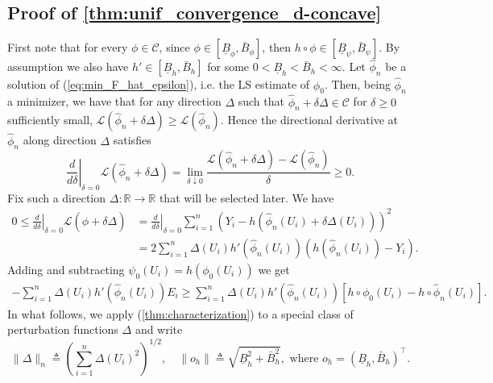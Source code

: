 \documentclass{article} %
\def\eqref#1{equation~\ref{#1}}
\renewcommand{\eqref}[1]{(\ref{#1})}
\begin{document}
\newpage
\subsection{Proof of \cref{thm:unif_convergence_d-concave}}\label{app:unif_convergence_d-concave}
First note that for every $\phi \in \mathcal{C}$, since $\phi \in [\underline{B}_{\phi},\bar{B}_{\phi}]$, then $h \circ \phi \in [\underline{B}_{\psi}, \bar{B}_{\psi}]$. By assumption we also have $h' \in [\underline{B}_{h},\bar{B}_{h}]$ for some $0<\underline{B}_{h}<\bar{B}_{h}<\infty$. Let $\widehat{\phi}_n$ be a solution of \eqref{eq:min_F_hat_epsilon}, i.e. the LS estimate of $\phi_0$. Then, being $\widehat{\phi}_n$ a minimizer, we have that for any direction $\Delta$ such that $\widehat{\phi}_n+\delta \Delta \in \mathcal{C}$ for $\delta\geq 0$ sufficiently small, $\mathcal{L}(\widehat{\phi}_n+\delta \Delta) \geq \mathcal{L}(\widehat{\phi}_n)$. Hence the directional derivative at $\widehat{\phi}_n$ along direction $\Delta$ satisfies 
$$
\left.\frac{d}{d \delta}\right|_{\delta=0} 
\mathcal{L} (\widehat \phi_n + \delta \Delta) = \lim _{\delta \downarrow 0} \frac{\mathcal{L} (\widehat \phi_n + \delta \Delta)-\mathcal{L} (\widehat \phi_n)}{\delta} \geq 0.
$$
Fix such a direction $\Delta: \mathbb{R} \rightarrow \mathbb{R}$ that will be selected later. We have
\begin{align*}
0 \leq\left.\frac{d}{d \delta}\right|_{\delta=0} 
\mathcal{L} (\widehat \phi + \delta \Delta) &= \left.\frac{d}{d \delta}\right|_{\delta=0} \sum_{i=1}^n\left(Y_i-h(\widehat{\phi}_n\left(U_i\right)+\delta\Delta\left(U_i\right))\right)^2\\
&=2 \sum_{i=1}^n \Delta\left(U_i\right)h'(\widehat{\phi}_n\left(U_i\right))  \left(h(\widehat{\phi}_n\left(U_i\right))-Y_i\right).
\end{align*}
\noindent
Adding and subtracting $\psi_0(U_i) = h(\phi_0 (U_i))$ we get
\begin{align}\label{thm:characterization}
-\sum_{i=1}^n \Delta\left(U_i\right)h'(\widehat{\phi}_n\left(U_i\right)) E_i \geq \sum_{i=1}^n \Delta\left(U_i\right)h'(\widehat{\phi}_n\left(U_i\right))  \left[h\circ \phi_0\left(U_i\right)-h \circ \widehat{\phi}_n\left(U_i\right)\right].
\end{align}
In what follows, we apply \eqref{thm:characterization} to a special class of perturbation functions $\Delta$ and write
$$
\|\Delta\|_n\triangleq \left(\sum_{i=1}^n \Delta\left(U_i\right)^2\right)^{1 / 2}, \quad \|o_h\| \triangleq \sqrt{\underline{B}_{h}^2+\bar{B}_{h}^2}, \text{ where } o_h = (\underline{B}_{h},\bar{B}_{h})^{\top}.
$$
\end{document}
